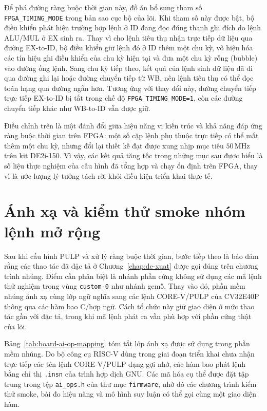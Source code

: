 \documentclass[../DoAn.tex]{subfiles}
\begin{document}
Để phá đường ràng buộc thời gian này, đồ án bổ sung tham số \texttt{FPGA\allowbreak\_TIMING\allowbreak\_MODE} trong bản sao cục bộ của lõi. Khi tham số này được bật, bộ điều khiển phát hiện trường hợp lệnh ở ID đang đọc đúng thanh ghi đích do lệnh ALU/MUL ở EX sinh ra. Thay vì cho lệnh tiêu thụ nhận trực tiếp dữ liệu qua đường EX-to-ID, bộ điều khiển giữ lệnh đó ở ID thêm một chu kỳ, vô hiệu hóa các tín hiệu ghi điều khiển của chu kỳ hiện tại và đưa một chu kỳ rỗng (bubble) vào đường ống lệnh. Sang chu kỳ tiếp theo, kết quả của lệnh sinh dữ liệu đã đi qua đường ghi lại hoặc đường chuyển tiếp từ WB, nên lệnh tiêu thụ có thể đọc toán hạng qua đường ngắn hơn. Tương ứng với thay đổi này, đường chuyển tiếp trực tiếp EX-to-ID bị tắt trong chế độ \texttt{FPGA\allowbreak\_TIMING\allowbreak\_MODE=1}, còn các đường chuyển tiếp khác như WB-to-ID vẫn được giữ.

Điều chỉnh trên là một đánh đổi giữa hiệu năng vi kiến trúc và khả năng đáp ứng ràng buộc thời gian trên FPGA: một số cặp lệnh phụ thuộc trực tiếp có thể mất thêm một chu kỳ, nhưng đổi lại thiết kế đạt được xung nhịp mục tiêu \(50\,\mathrm{MHz}\) trên kit DE2i-150. Vì vậy, các kết quả tăng tốc trong những mục sau được hiểu là số liệu thực nghiệm của cấu hình đã tổng hợp và chạy ổn định trên FPGA, thay vì là ước lượng lý tưởng tách rời khỏi điều kiện triển khai thực tế.

\section{Ánh xạ và kiểm thử smoke nhóm lệnh mở rộng}
\label{sec:anh-xa-smoke-board}

Sau khi cấu hình PULP và xử lý ràng buộc thời gian, bước tiếp theo là bảo đảm rằng các thao tác đã đặc tả ở Chương~\ref{chap:de-xuat} được gọi đúng trên chương trình nhúng. Điểm cần phân biệt là nhánh phần cứng không sử dụng các mã lệnh thử nghiệm trong vùng \texttt{custom-0} như nhánh gem5. Thay vào đó, phần mềm nhúng ánh xạ cùng lớp ngữ nghĩa sang các lệnh CORE-V/PULP của CV32E40P thông qua các hàm bao C/hợp ngữ. Cách tổ chức này giữ giao diện ở mức thao tác gần với đặc tả, trong khi mã lệnh phát ra vẫn phù hợp với phần cứng thật của lõi.

Bảng~\ref{tab:board-ai-op-mapping} tóm tắt lớp ánh xạ được sử dụng trong phần mềm nhúng. Do bộ công cụ RISC-V dùng trong giai đoạn triển khai chưa nhận trực tiếp các tên lệnh CORE-V/PULP dạng gợi nhớ, các hàm bao phát lệnh bằng chỉ thị \texttt{.insn} của trình hợp dịch GNU. Các mã hóa cụ thể được đặt tập trung trong tệp \texttt{ai\_ops.h} của thư mục \texttt{firmware}, nhờ đó các chương trình kiểm thử smoke, bài đo hiệu năng và mô hình suy luận có thể gọi cùng một giao diện hàm.
\end{document}
